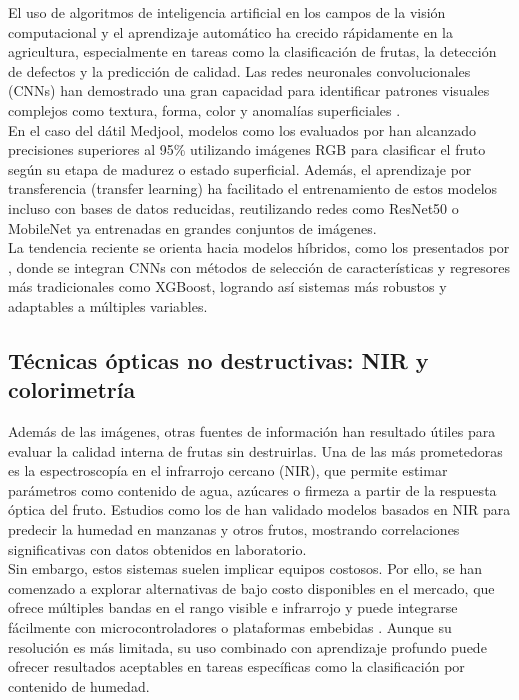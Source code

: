 El uso de algoritmos de inteligencia artificial en los campos de la visión computacional y el aprendizaje automático ha crecido rápidamente en la agricultura, especialmente en tareas como la clasificación de frutas, la detección de defectos y la predicción de calidad. Las redes neuronales convolucionales (CNNs) han demostrado una gran capacidad para identificar patrones visuales complejos como textura, forma, color y anomalías superficiales \parencite{albarrak_deep_2022, alsirhani_novel_2023}.\\

En el caso del dátil Medjool, modelos como los evaluados por \parencite{almomen_date_2023} han alcanzado precisiones superiores al 95\% utilizando imágenes RGB para clasificar el fruto según su etapa de madurez o estado superficial. Además, el aprendizaje por transferencia (transfer learning) ha facilitado el entrenamiento de estos modelos incluso con bases de datos reducidas, reutilizando redes como ResNet50 o MobileNet ya entrenadas en grandes conjuntos de imágenes.\\

La tendencia reciente se orienta hacia modelos híbridos, como los presentados por \parencite{said_smartripen_2025}, donde se integran CNNs con métodos de selección de características y regresores más tradicionales como XGBoost, logrando así sistemas más robustos y adaptables a múltiples variables.

\subsection{Técnicas ópticas no destructivas: NIR y colorimetría}

Además de las imágenes, otras fuentes de información han resultado útiles para evaluar la calidad interna de frutas sin destruirlas. Una de las más prometedoras es la espectroscopía en el infrarrojo cercano (NIR), que permite estimar parámetros como contenido de agua, azúcares o firmeza a partir de la respuesta óptica del fruto. Estudios como los de \parencite{chen_prediction_2024, wang_improving_2025} han validado modelos basados en NIR para predecir la humedad en manzanas y otros frutos, mostrando correlaciones significativas con datos obtenidos en laboratorio.\\

Sin embargo, estos sistemas suelen implicar equipos costosos. Por ello, se han comenzado a explorar alternativas de bajo costo disponibles en el mercado, que ofrece múltiples bandas en el rango visible e infrarrojo y puede integrarse fácilmente con microcontroladores o plataformas embebidas \parencite{passos_deep_2023}. Aunque su resolución es más limitada, su uso combinado con aprendizaje profundo puede ofrecer resultados aceptables en tareas específicas como la clasificación por contenido de humedad.\\

